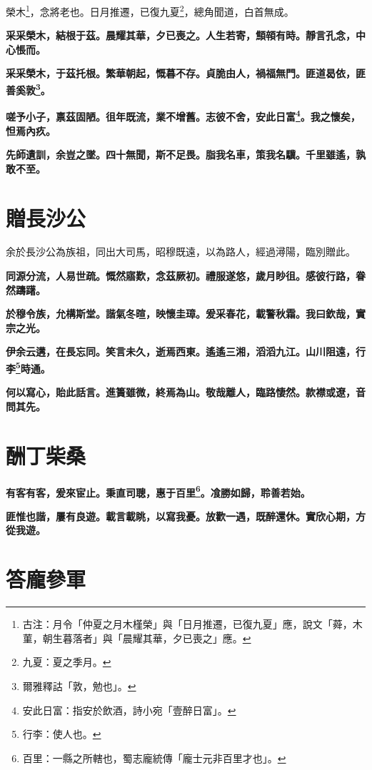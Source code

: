 \begin{quoting}榮木\footnote{古注：月令「仲夏之月木槿榮」與「日月推遷，已復九夏」應，說文「蕣，木菫，朝生暮落者」與「晨耀其華，夕已喪之」應。}，念將老也。日月推遷，已復九夏\footnote{九夏：夏之季月。}，總角聞道，白首無成。\end{quoting}

\textbf{采采榮木，結根于茲。晨耀其華，夕已喪之。人生若寄，顦顇有時。靜言孔念，中心悵而。}

\textbf{采采榮木，于茲托根。繁華朝起，慨暮不存。貞脆由人，禍福無門。匪道曷依，匪善奚敦\footnote{爾雅釋詁「敦，勉也」。}。}

\textbf{嗟予小子，禀茲固陋。徂年既流，業不增舊。志彼不舍，安此日富\footnote{安此日富：指安於飲酒，詩小宛「壹醉日富」。}。我之懷矣，怛焉內疚。}

\textbf{先師遺訓，余豈之墜。四十無聞，斯不足畏。脂我名車，策我名驥。千里雖遙，孰敢不至。}

\section{贈長沙公\hspace{1ex}{\footnotesize 并序}}

\begin{quoting}余於長沙公為族祖，同出大司馬，昭穆既遠，以為路人，經過潯陽，臨別贈此。\end{quoting}

\textbf{同源分流，人易世疏。慨然寤歎，念茲厥初。禮服遂悠，歲月眇徂。感彼行路，眷然躊躇。}

\textbf{於穆令族，允構斯堂。諧氣冬暄，映懷圭璋。爰采春花，載警秋霜。我曰欽哉，實宗之光。}

\textbf{伊余云遘，在長忘同。笑言未久，逝焉西東。遙遙三湘，滔滔九江。山川阻遠，行李\footnote{行李：使人也。}時通。}

\textbf{何以寫心，貽此話言。進簣雖微，終焉為山。敬哉離人，臨路悽然。款襟或遼，音問其先。}

\section{酬丁柴桑}

\textbf{有客有客，爰來宦止。秉直司聰，惠于百里\footnote{百里：一縣之所轄也，蜀志龐統傳「龐士元非百里才也」。}。飡勝如歸，聆善若始。}

\textbf{匪惟也諧，屢有良遊。載言載眺，以寫我憂。放歡一遇，既醉還休。實欣心期，方從我遊。}

\section{答龐參軍\hspace{1ex}{\footnotesize 并序}}

